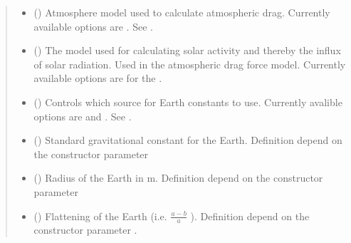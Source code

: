 \documentclass[letterpaper,10pt,english]{sphinxmanual}
\begin{document}
\begin{fulllineitems}
\begin{quote}
\begin{description}
\begin{itemize}
\item {} 
 () \textendash{} Atmosphere model used to calculate atmospheric drag. Currently available options are . See .

\item {} 
 () \textendash{} The model used for calculating solar activity and thereby the influx of solar radiation. Used in the atmospheric drag force model. Currently available options are  for the .

\item {} 
 () \textendash{} Controls which source for Earth constants to use. Currently avalible options are  and . See .

\item {} 
 () \textendash{} Standard gravitational constant for the Earth.  Definition depend on the {\hyperref[\detokenize{modules/propagator_orekit:propagator_orekit.PropagatorOrekit}]{}} constructor parameter 

\item {} 
 () \textendash{} Radius of the Earth in m. Definition depend on the {\hyperref[\detokenize{modules/propagator_orekit:propagator_orekit.PropagatorOrekit}]{}} constructor parameter 

\item {} 
 () \textendash{} Flattening of the Earth (i.e. \(\frac{a-b}{a}\) ). Definition depend on the {\hyperref[\detokenize{modules/propagator_orekit:propagator_orekit.PropagatorOrekit}]{}} constructor parameter .


\end{itemize}
\end{description}
\end{quote}
\end{fulllineitems}
\end{document}
